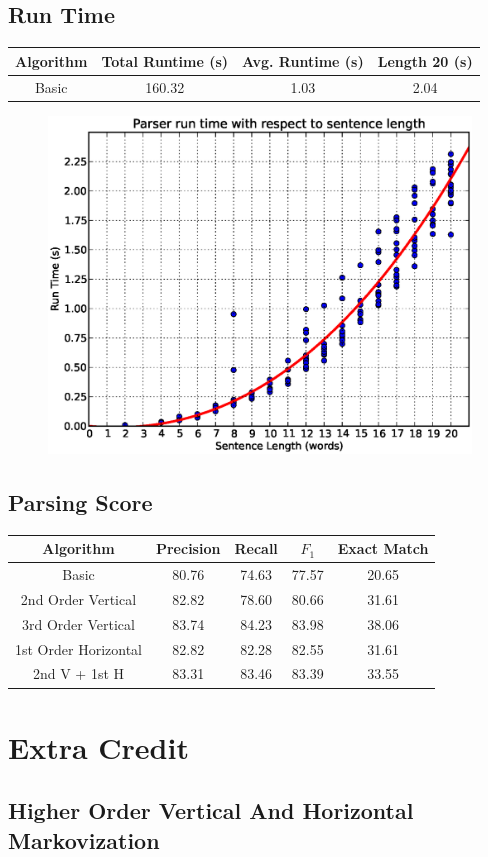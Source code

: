 \documentclass[12pt]{article}
\begin{document}
\subsection{Run Time}
\begin{center}
\begin{tabular}{|c|c|c|c|}
\hline
Algorithm & Total Runtime (s) & Avg. Runtime (s) & Length 20 (s)\\\hline
Basic & 160.32 & 1.03 & 2.04 \\\hline

\end{tabular}
\end{center}
\begin{figure}[H]
\centering
\includegraphics[width=0.5\linewidth]{./stats/runtime}
\end{figure}
\subsection{Parsing Score}
\begin{center}
\begin{tabular}{|c|c|c|c|c|}
\hline
Algorithm & Precision & Recall & $F_1$ & Exact Match \\\hline
Basic & 80.76 & 74.63 & 77.57 & 20.65\\\hline
2nd Order Vertical & 82.82 & 78.60 & 80.66 & 31.61 \\\hline
3rd Order Vertical & 83.74 & 84.23 & 83.98 & 38.06 \\\hline
1st Order Horizontal & 82.82 & 82.28 & 82.55 & 31.61 \\\hline
2nd V + 1st H & 83.31 & 83.46 & 83.39 & 33.55 \\\hline
\end{tabular}
\end{center}
\section{Extra Credit}
\subsection{Higher Order Vertical And Horizontal Markovization}
\end{document}
